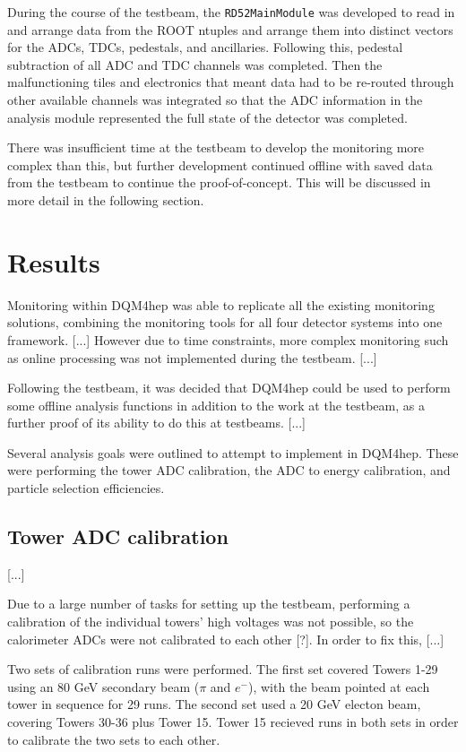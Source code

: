 During the course of the testbeam, the \texttt{RD52MainModule} was developed to read in and arrange data from the ROOT ntuples and arrange them into distinct vectors for the ADCs, TDCs, pedestals, and ancillaries. Following this, pedestal subtraction of all ADC and TDC channels was completed. Then the malfunctioning tiles and electronics that meant data had to be re-routed through other available channels was integrated so that the ADC information in the analysis module represented the full state of the detector was completed. 

There was insufficient time at the testbeam to develop the monitoring more complex than this, but further development continued offline with saved data from the testbeam to continue the proof-of-concept. This will be discussed in more detail in the following section.

\section{Results}
Monitoring within DQM4hep was able to replicate all the existing monitoring solutions, combining the monitoring tools for all four detector systems into one framework. [...] However due to time constraints, more complex monitoring such as online processing was not implemented during the testbeam. [...] 

Following the testbeam, it was decided that DQM4hep could be used to perform some offline analysis functions in addition to the work at the testbeam, as a further proof of its ability to do this at testbeams. [...]

Several analysis goals were outlined to attempt to implement in DQM4hep. These were performing the tower ADC calibration, the ADC to energy calibration, and particle selection efficiencies. 

\subsection{Tower ADC calibration}
[...]

Due to a large number of tasks for setting up the testbeam, performing a calibration of the individual towers' high voltages was not possible, so the calorimeter ADCs were not calibrated to each other [?]. In order to fix this, [...]

Two sets of calibration runs were performed. The first set covered Towers 1-29 using an 80 GeV secondary beam ($\pi$ and $e^{-}$), with the beam pointed at each tower in sequence for 29 runs. The second set used a 20 GeV electon beam, covering Towers 30-36 plus Tower 15. Tower 15 recieved runs in both sets in order to calibrate the two sets to each other. 

